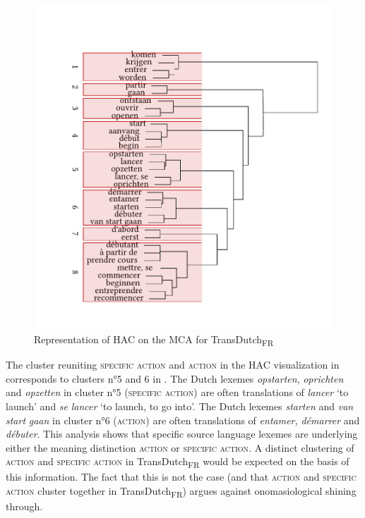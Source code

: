 \begin{figure}
\includegraphics[width=.75\textwidth,trim=0 20 0 50]{figures/tree93.pdf}
\caption{\label{fig:4:90}Representation of HAC on the MCA for TransDutch\textsubscript{FR}}
\end{figure}

The cluster reuniting {\textsc{specific}} \textsc{action} and \textsc{action} in the HAC visualization in  corresponds to clusters n°5 and 6 in . The Dutch lexemes \textit{opstarten}, \textit{oprichten} and \textit{opzetten} in cluster n°5 ({\textsc{specific}} \textsc{action}) are often translations of \textit{lancer} `to launch' and \textit{se} \textit{lancer} `to launch, to go into'. The Dutch lexemes \textit{starten} and \textit{van} \textit{start} \textit{gaan} in cluster n°6 (\textsc{action}) are often translations of \textit{entamer,} \textit{démarrer} and \textit{débuter}. This analysis shows that specific source language lexemes are underlying either the meaning distinction \textsc{action} or {\textsc{specific}} \textsc{action}. A distinct clustering of \textsc{action} and {\textsc{specific}} \textsc{action} in TransDutch\textsubscript{FR} would be expected on the basis of this information. The fact that this is not the case (and that \textsc{action} and {\textsc{specific}} \textsc{action} cluster together in TransDutch\textsubscript{FR}) argues against onomasiological shining through.

